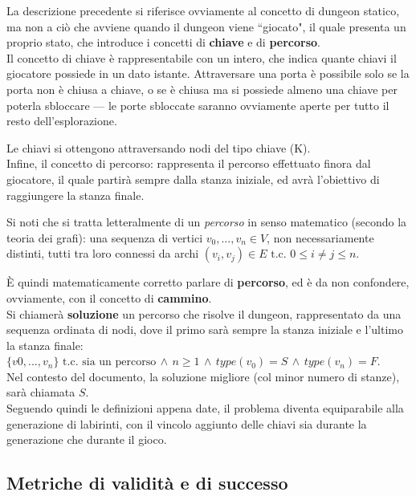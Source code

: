 \documentclass[12pt,titlepage]{article}
\begin{document}
\noindent La descrizione precedente si riferisce ovviamente al concetto di dungeon statico, ma non a ciò che avviene quando il dungeon viene ``giocato", il quale presenta un proprio stato, che introduce i concetti di \textbf{chiave} e di \textbf{percorso}.\\

\noindent Il concetto di chiave è rappresentabile con un intero, che indica quante chiavi il giocatore possiede in un dato istante. Attraversare una porta è possibile solo se la porta non è chiusa a chiave, o se è chiusa ma si possiede almeno una chiave per poterla sbloccare --- le porte sbloccate saranno ovviamente aperte per tutto il resto dell'esplorazione.

Le chiavi si ottengono attraversando nodi del tipo chiave (K).\\

\noindent Infine, il concetto di percorso: rappresenta il percorso effettuato finora dal giocatore, il quale partirà sempre dalla stanza iniziale, ed avrà l'obiettivo di raggiungere la stanza finale.

Si noti che si tratta letteralmente di un \textit{percorso} in senso matematico (secondo la teoria dei grafi): una sequenza di vertici $v_0, ..., v_n \in V$, non necessariamente distinti, tutti tra loro connessi da archi $(v_i, v_j) \in E \text{ t.c. } 0 \leq i \neq j \leq n$.

È quindi matematicamente corretto parlare di \textbf{percorso}, ed è da non confondere, ovviamente, con il concetto di \textbf{cammino}.\\

\noindent Si chiamerà \textbf{soluzione} un percorso che risolve il dungeon, rappresentato da una sequenza ordinata di nodi, dove il primo sarà sempre la stanza iniziale e l'ultimo la stanza finale:\\
$\{v0, ..., v_n\} \text{ t.c. } \text{sia un percorso} \, \land \, n \geq 1 \, \land \, type(v_0) = S \, \land \, type(v_n) = F$.\\
Nel contesto del documento, la soluzione migliore (col minor numero di stanze), sarà chiamata $S$.\\

\noindent Seguendo quindi le definizioni appena date, il problema diventa equiparabile alla generazione di labirinti, con il vincolo aggiunto delle chiavi sia durante la generazione che durante il gioco.

\subsection {Metriche di validità e di successo}
\end{document}
